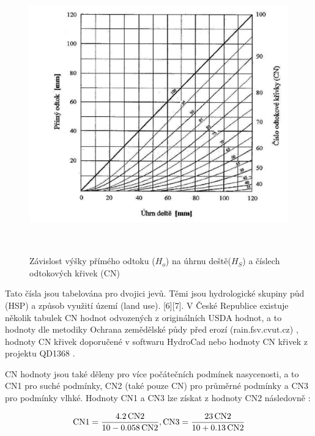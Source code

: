 \documentclass[a4paper,oneside,12pt]{book}
\begin{document}
\begin{figure}[ht] \label{obr1}
\centering
\includegraphics[height=12cm]{pictures/CNcurves.jpg}
\caption{ Závislost výšky přímého odtoku ($H_{o}$) na úhrnu deště($H_{S}$) a číslech odtokových křivek (CN) \cite{MNYDGwleJOjKdRUp}}
\label{fig:example}
\end{figure}

 \hspace{10mm} Tato čísla jsou tabelována pro dvojici jevů. Těmi jsou hydrologické skupiny půd (HSP) a způsob využití území (land use). [6][7]. V České Republice existuje několik tabulek CN hodnot odvozených z originálních USDA hodnot, a to hodnoty dle metodiky Ochrana zemědělské půdy před erozí (rain.fsv.cvut.cz) \cite{MNYDGwleJOjKdRUp}, hodnoty CN křivek doporučené v softwaru HydroCad nebo hodnoty CN křivek z projektu QD1368 \cite{Kulasova2004}.

 \hspace{10mm} CN hodnoty jsou také děleny pro více počátečních podmínek nasycenosti, a to CN1 pro suché podmínky, CN2 (také pouze CN) pro průměrné podmínky a CN3 pro podmínky vlhké. \cite{dile2016} Hodnoty CN1 a CN3 lze získat z hodnoty CN2 následovně \cite{Batvari2021}:
 
 \begin{equation}
\text{CN1} = \frac{4.2 \, \text{CN2}}{10 - 0.058 \, \text{CN2}},  \\
\text{CN3} = \frac{23 \, \text{CN2}}{10 + 0.13 \, \text{CN2}}
\end{equation}
\end{document}
